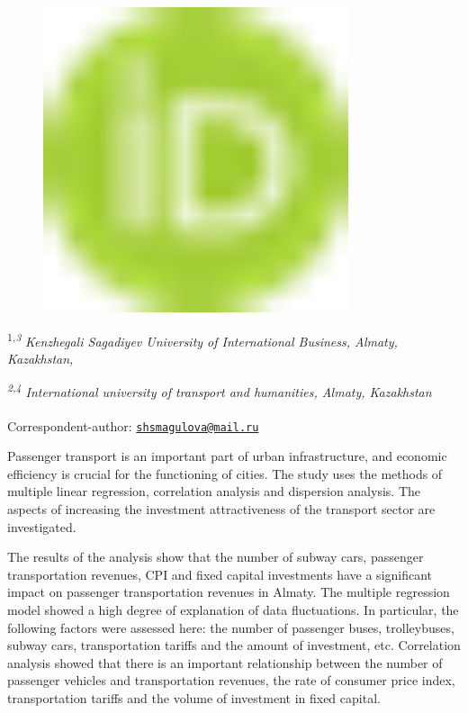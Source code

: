 \begin{figure}[H]
	\centering
	\includegraphics[width=0.8\textwidth]{media/ekon2/image1}
	\caption*{}
\end{figure}


\textsuperscript{1\emph{,3 }}\emph{Kenzhegali Sagadiyev University of
International Business, Almaty, Kazakhstan,}

\emph{\textsuperscript{2,4} International university of transport and
humanities, Almaty, Kazakhstan}

{\bfseries \textsuperscript{\envelope }}Correspondent-author:
\href{mailto:shsmagulova@mail.ru}{\nolinkurl{shsmagulova@mail.ru}}

Passenger transport is an important part of urban infrastructure, and
economic efficiency is crucial for the functioning of cities. The study
uses the methods of multiple linear regression, correlation analysis and
dispersion analysis. The aspects of increasing the investment
attractiveness of the transport sector are investigated.

The results of the analysis show that the number of subway cars,
passenger transportation revenues, CPI and fixed capital investments
have a significant impact on passenger transportation revenues in
Almaty. The multiple regression model showed a high degree of
explanation of data fluctuations. In particular, the following factors
were assessed here: the number of passenger buses, trolleybuses, subway
cars, transportation tariffs and the amount of investment, etc.
Correlation analysis showed that there is an important relationship
between the number of passenger vehicles and transportation revenues,
the rate of consumer price index, transportation tariffs and the volume
of investment in fixed capital.


